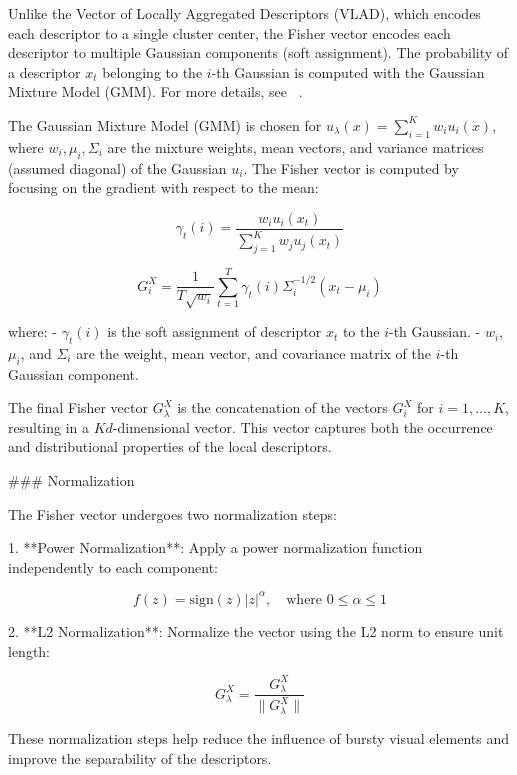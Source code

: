 Unlike the Vector of Locally Aggregated Descriptors (VLAD), which encodes each descriptor to a single cluster center, the Fisher vector encodes each descriptor to multiple Gaussian components (soft assignment). The
probability of a descriptor \(x_t\) belonging to the \(i\)-th Gaussian is computed with the Gaussian Mixture Model (GMM). For more details, see ~\cite{viroli2017deep}.

The Gaussian Mixture Model (GMM) is chosen for \(u_{\lambda}(x) = \sum_{i=1}^{K} w_i u_i(x)\), where \(w_i, \mu_i, \Sigma_i\) are the mixture weights, mean vectors, and variance matrices (assumed diagonal) of the Gaussian \(u_i\). The Fisher vector is computed by focusing on the gradient with respect to the mean:

\[
\gamma_t(i) = \frac{w_i u_i(x_t)}{\sum_{j=1}^{K} w_j u_j(x_t)}
\]

\[
G^{X}_{i} = \frac{1}{T \sqrt{w_i}} \sum_{t=1}^{T} \gamma_t(i) \Sigma_i^{-1/2} (x_t - \mu_i)
\]

where:
- \(\gamma_t(i)\) is the soft assignment of descriptor \(x_t\) to the \(i\)-th Gaussian.
- \(w_i\), \(\mu_i\), and \(\Sigma_i\) are the weight, mean vector, and covariance matrix of the \(i\)-th Gaussian component.

The final Fisher vector \(G^{X}_{\lambda}\) is the concatenation of the vectors \(G^{X}_{i}\) for \(i = 1, \ldots, K\), resulting in a \(Kd\)-dimensional vector. This vector captures both the occurrence and distributional properties of the local descriptors. 

### Normalization

The Fisher vector undergoes two normalization steps:

1. **Power Normalization**: Apply a power normalization function independently to each component:

\[
f(z) = \text{sign}(z) |z|^\alpha, \quad \text{where } 0 \leq \alpha \leq 1
\]

2. **L2 Normalization**: Normalize the vector using the L2 norm to ensure unit length:

\[
G^{X}_{\lambda} = \frac{G^{X}_{\lambda}}{\|G^{X}_{\lambda}\|}
\]

These normalization steps help reduce the influence of bursty visual elements and improve the separability of the descriptors.

